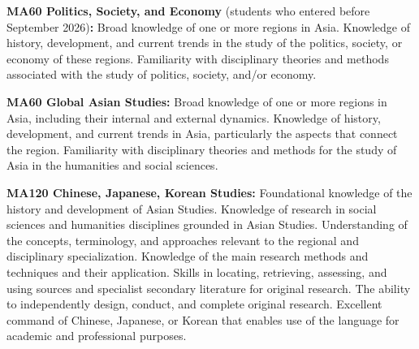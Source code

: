 \documentclass[11pt,a4paper]{article}
\begin{document}
\textbf{MA60 Politics, Society, and Economy} (students who entered before September 2026)\textbf{:} Broad knowledge of one or more regions in Asia. Knowledge of history, development, and current trends in the study of the politics, society, or economy of these regions. Familiarity with disciplinary theories and methods associated with the study of politics, society, and/or economy.

\textbf{MA60 Global Asian Studies:} Broad knowledge of one or more regions in Asia, including their internal and external dynamics. Knowledge of history, development, and current trends in Asia, particularly the aspects that connect the region. Familiarity with disciplinary theories and methods for the study of Asia in the humanities and social sciences.

\textbf{MA120 Chinese, Japanese, Korean Studies:} Foundational knowledge of the history and development of Asian Studies. Knowledge of research in social sciences and humanities disciplines grounded in Asian Studies. Understanding of the concepts, terminology, and approaches relevant to the regional and disciplinary specialization. Knowledge of the main research methods and techniques and their application. Skills in locating, retrieving, assessing, and using sources and specialist secondary literature for original research. The ability to independently design, conduct, and complete original research. Excellent command of Chinese, Japanese, or Korean that enables use of the language for academic and professional purposes.
\end{document}
